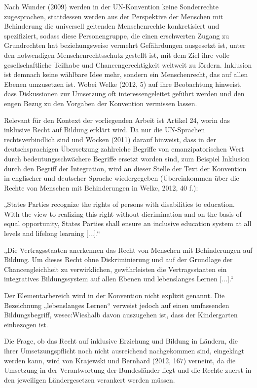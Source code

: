 Nach Wunder (2009) werden in der UN-Konvention keine Sonderrechte zugesprochen, stattdessen werden aus der Perspektive der Menschen mit Behinderung die universell geltenden Menschenrechte konkretisiert und spezifiziert, sodass diese Personengruppe, die einen erschwerten Zugang zu Grundrechten hat beziehungsweise vermehrt Gefährdungen ausgesetzt ist, unter den notwendigen Menschenrechtsschutz gestellt ist, mit dem Ziel ihre volle gesellschaftliche Teilhabe und Chancengerechtigkeit weltweit zu fördern. Inklusion ist demnach keine wählbare Idee mehr, sondern ein Menschenrecht, das auf allen Ebenen umzusetzen ist. Wobei Welke (2012, 5) auf ihre Beobachtung hinweist, dass Diskussionen zur Umsetzung oft interessengeleitet geführt werden und den engen Bezug zu den Vorgaben der Konvention vermissen lassen. 

Relevant für den Kontext der vorliegenden Arbeit ist Artikel 24, worin das inklusive Recht auf Bildung erklärt wird. Da nur die UN-Sprachen rechtsverbindlich sind und Wocken (2011) darauf hinweist, dass in der deutschsprachigen Übersetzung zahlreiche Begriffe von emanzipatorischen Wert durch bedeutungsschwächere Begriffe ersetzt worden sind, zum Beispiel Inklusion durch den Begriff der Integration, wird an dieser Stelle der Text der Konvention in englischer und deutscher Sprache wiedergegeben (Übereinkommen über die Rechte von Menschen mit Behinderungen in Welke, 2012, 40 f.): 

„States Parties recognize the rights of persons with disabilities to education. With the view to realizing this right without dicrimination and on the basis of equal opportunity, States Parties shall ensure an inclusive education system at all levels and lifelong learning [...].“ 

„Die Vertragsstaaten anerkennen das Recht von Menschen mit Behinderungen auf Bildung. Um dieses Recht ohne Diskriminierung und auf der Grundlage der Chancengleichheit zu verwirklichen, gewährleisten die Vertragsstaaten ein integratives Bildungssystem auf allen Ebenen und lebenslanges Lernen [...].“

Der Elementarbereich wird in der Konvention nicht explizit genannt. Die Bezeichnung „lebenslanges Lernen“ verweist jedoch auf einen umfassenden Bildungsbegriff, we{sec:Wie}shalb davon auszugehen ist, dass der Kindergarten  einbezogen ist. 

Die Frage, ob das Recht auf inklusive Erziehung und Bildung in Ländern, die ihrer Umsetzungspflicht noch nicht ausreichend nachgekommen sind, eingeklagt werden kann, wird von Krajewski und Bernhard (2012, 167) verneint, da die Umsetzung in der Verantwortung der Bundesländer liegt und die Rechte zuerst in den jeweiligen Ländergesetzen verankert werden müssen. 

